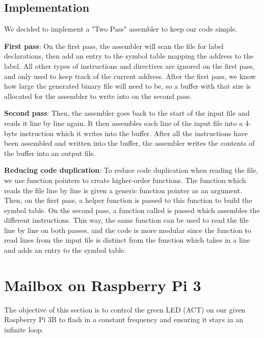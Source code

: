 \documentclass{article}
\begin{document}
\begin{adjustwidth}{2em}{0pt}
        \subsection{Implementation}
        
            We decided to implement a "Two Pass" assembler to keep our code simple. 
            
            \textbf{First pass}: On the first pass, the assembler will scan the file for label declarations, then add an entry to the symbol table mapping the address to the label. All other types of instructions and directives are ignored on the first pass, and only used to keep track of the current address. After the first pass, we know how large the generated binary file will need to be, so a buffer with that size is allocated for the assembler to write into on the second pass. 
        
            \textbf{Second pass}: Then, the assembler goes back to the start of the input file and reads it line by line again. It then assembles each line of the input file into a 4-byte instruction which it writes into the buffer. After all the instructions have been assembled and written into the buffer, the assembler writes the contents of the buffer into an output file.
            
            \textbf{Reducing code duplication}: To reduce code duplication when reading the file, we use function pointers to create higher-order functions. The function which reads the file line by line is given a generic function pointer as an argument. Then, on the first pass, a helper function is passed to this function to build the symbol table. On the second pass, a function called is passed which assembles the different instructions. This way, the same function can be used to read the file line by line on both passes, and the code is more modular since the function to read lines from the input file is distinct from the function which takes in a line and adds an entry to the symbol table.
            
        \end{adjustwidth}
    
    
    \section{Mailbox on Raspberry Pi 3}

        The objective of this section is to control the green LED (ACT) on our given Raspberry Pi 3B to flash in a constant frequency and ensuring it stays in an infinite loop.
        
\end{document}
